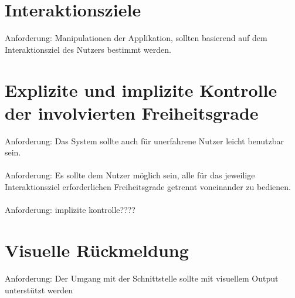 \section{Interaktionsziele}
\label{sec:interaktionsziele}

Anforderung: Manipulationen der Applikation, sollten basierend auf dem Interaktionsziel des Nutzers bestimmt werden.


\section{Explizite und implizite Kontrolle der involvierten Freiheitsgrade}
\label{sec:kontrolle_der_freiheitsgrade}

Anforderung: Das System sollte auch für unerfahrene Nutzer leicht benutzbar sein.
\\\\
Anforderung: Es sollte dem Nutzer möglich sein, alle für das jeweilige Interaktionsziel erforderlichen Freiheitsgrade getrennt voneinander zu bedienen.
\\\\
Anforderung: implizite kontrolle????



\section{Visuelle Rückmeldung}
\label{sec:visuelle_rueckmeldung}

Anforderung: Der Umgang mit der Schnittstelle sollte mit visuellem Output unterstützt werden